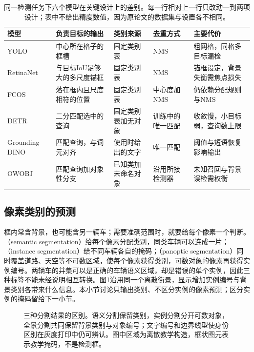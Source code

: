 \begin{table}[tbp]
 \centering
 \small
 \begin{tabularx}{\linewidth}{@{}lXXXX@{}}
 \toprule
 模型 & 负责目标的输出 & 类别来源 & 去重方式 & 主要代价\\
 \midrule
 YOLO & 中心所在格子的框槽 & 固定类别表 & NMS & 粗网格，同格多目标漏检\\
 RetinaNet & 与目标IoU足够大的多尺度锚框 & 固定类别表 & NMS & 锚框设定，背景失衡需焦点损失\\
 FCOS & 落在框内且尺度相符的位置 & 固定类别表 & 中心度加NMS & 仍依赖分配规则与NMS\\
 DETR & 二分匹配选中的查询 & 固定类别表加无对象 & 训练中的唯一匹配 & 收敛慢，小目标弱，查询数上限\\
 Grounding DINO & 匹配查询，与词元对齐 & 使用时给出的文字 & 唯一匹配 & 阈值与短语恢复影响输出\\
 OWOBJ & 匹配查询加对象性分支 & 已知类加未命名对象 & 沿用所接检测器 & 未知召回与背景误检需权衡\\
 \bottomrule
 \end{tabularx}
 \caption{同一检测任务下六个模型在关键设计上的差别。每一行相对上一行只改动一到两项设计；表中不给出精度数值，因为原论文的数据集与设置各不相同。}
 \label{tab:vision-recognition-detection-compare}
\end{table}

\subsection{像素类别的预测}
\label{sec:vision-recognition-segmentation}
\label{sec:vision-recognition-dense-pixels}

框内常含背景，也可能含另一辆车；需要准确范围时，就要给每个像素一个判断。（semantic segmentation）给每个像素分配类别，同类车辆可以连成一片；（instance segmentation）给不同车辆各自的掩码；（panoptic segmentation）同时覆盖道路、天空等不可数区域，使每个像素获得类别，可数对象的像素再获得实例编号。两辆车的并集可以是正确的车辆语义区域，却是错误的单个实例，因此三种标签不能未经说明相互转换。图\ref{fig:vision-segmentation-outputs}沿用同一个离散街景，显示增加实例编号与背景类别各带来什么信息。本小节讨论只输出类别、不区分实例的像素预测；区分实例的掩码留给下一小节。

\begin{figure}[htbp]
 \centering
 
 \caption{三种分割结果的区别。语义分割保留类别，实例分割分开可数对象，全景分割共同保留背景类别与对象编号；文字编号和边界线型使身份区别在灰度打印中仍可辨认。图中区域为离散教学构造，框状图元表示教学掩码，不是检测框。}
 \label{fig:vision-segmentation-outputs}
\end{figure}

